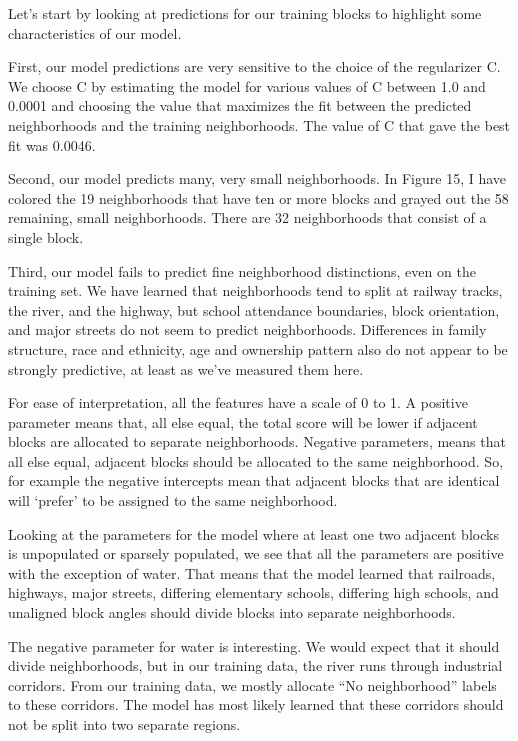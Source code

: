 \documentclass[12pt,letter]{article}\usepackage[]{graphicx}\usepackage[]{color}
\begin{document}
Let’s start by looking at predictions for our training blocks to
highlight some characteristics of our model.


First, our model predictions are very sensitive to the choice of the regularizer
C. We choose C by estimating the model for various values of C between
1.0 and 0.0001 and choosing the value that maximizes the fit between the
predicted neighborhoods and the training neighborhoods. The value of C
that gave the best fit was 0.0046.

Second, our model predicts many, very small neighborhoods. In Figure 15,
I have colored the 19 neighborhoods that have ten or more blocks and grayed
out the 58 remaining, small neighborhoods. There are 32 neighborhoods that
consist of a single block.

Third, our model fails to predict fine neighborhood distinctions, even
on the training set. We have learned that neighborhoods tend to split at
railway tracks, the river, and the highway, but school attendance boundaries,
block orientation, and major streets do not seem to predict neighborhoods.
Differences in family structure, race and ethnicity, age and ownership pattern
also do not appear to be strongly predictive, at least as we’ve measured them
here.

For ease of interpretation, all the features have a scale of 0 to 1. A
positive parameter means that, all else equal, the total score will be
lower if adjacent blocks are allocated to separate
neighborhoods. Negative parameters, means that all else equal,
adjacent blocks should be allocated to the same neighborhood. So, for
example the negative intercepts mean that adjacent blocks that are
identical will ‘prefer’ to be assigned to the same neighborhood.

Looking at the parameters for the model where at least one two
adjacent blocks is unpopulated or sparsely populated, we see that all
the parameters are positive with the exception of water. That means
that the model learned that railroads, highways, major streets,
differing elementary schools, differing high schools, and unaligned
block angles should divide blocks into separate neighborhoods.  

The negative parameter for water is interesting. We would expect that
it should divide neighborhoods, but in our training data, the river
runs through industrial corridors. From our training data, we mostly
allocate “No neighborhood” labels to these corridors. The model has
most likely learned that these corridors should not be split into two
separate regions.  
\end{document}
